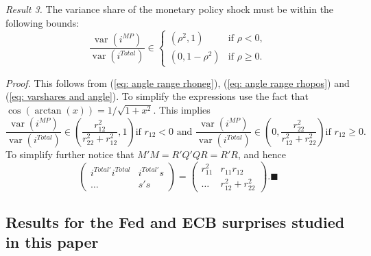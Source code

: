 \documentclass[a4paper,12pt]{article}
\begin{document}
\noindent\emph{Result 3.} The variance share of the monetary policy shock must be within the following bounds:
\begin{equation}
\frac{\operatorname{var}(i^{MP})}{\operatorname{var}(i^{Total})} \in 
\begin{cases}
(\rho^2,1) & \text{if } \rho<0, \\
(0,1-\rho^2) & \text{if } \rho\ge 0.
\end{cases}\label{eq: ranges varshare1}
\end{equation}

\emph{Proof.}
This follows from (\ref{eq: angle range rhoneg}), (\ref{eq: angle range rhopos}) and (\ref{eq: varshares and angle}).
To simplify the expressions use the fact that $\cos(\arctan(x))=1/\sqrt{1+x^2}$. This implies
\begin{equation}
\frac{\operatorname{var}(i^{MP})}{\operatorname{var}(i^{Total})}\in
\left(\frac{r_{12}^2}{r_{22}^2+r_{12}^2},1\right) \text{if }  r_{12}<0 \text{ and }
\frac{\operatorname{var}(i^{MP})}{\operatorname{var}(i^{Total})}
\in\left(0,\frac{r_{22}^2}{r_{12}^2+r_{22}^2}\right) \text{if }  r_{12}\ge0.
\end{equation}
To simplify further notice that $M'M=R'Q'QR=R'R$, and hence
\begin{equation}
\begin{pmatrix}i^{Total\prime}i^{Total} & i^{Total\prime}s\\ \dots & s's \end{pmatrix}=
\begin{pmatrix}r_{11}^2 & r_{11}r_{12}\\ \dots & r_{12}^2+r_{22} ^2\end{pmatrix}.\blacksquare
\end{equation}

\subsection{Results for the Fed and ECB surprises studied in this paper}
\end{document}
